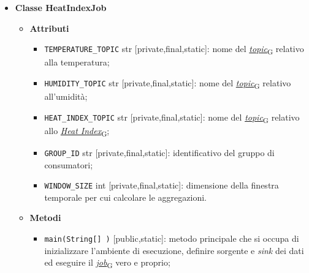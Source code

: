 \begin{itemize}
	\item \textbf{Classe HeatIndexJob}
	      \begin{itemize}
		      \item \textbf{Attributi}
		            \begin{itemize}
			            \item \texttt{TEMPERATURE\_TOPIC} str [private,final,static]: nome del \href{https://7last.github.io/docs/pb/documentazione-interna/glossario\#topic}{\textit{topic}\textsubscript{G}} relativo alla temperatura;
			            \item \texttt{HUMIDITY\_TOPIC} str [private,final,static]: nome del \href{https://7last.github.io/docs/pb/documentazione-interna/glossario\#topic}{\textit{topic}\textsubscript{G}} relativo all'umidità;
			            \item \texttt{HEAT\_INDEX\_TOPIC} str [private,final,static]: nome del \href{https://7last.github.io/docs/pb/documentazione-interna/glossario\#topic}{\textit{topic}\textsubscript{G}} relativo allo \href{https://7last.github.io/docs/pb/documentazione-interna/glossario\#heat-index}{\textit{Heat Index}\textsubscript{G}};
			            \item \texttt{GROUP\_ID} str [private,final,static]: identificativo del gruppo di consumatori;
			            \item \texttt{WINDOW\_SIZE} int [private,final,static]: dimensione della finestra temporale per cui calcolare le aggregazioni.
		            \end{itemize}
		      \item \textbf{Metodi}
		            \begin{itemize}
			            \item \texttt{main(String[] )} [public,static]: metodo principale che si occupa di inizializzare l'ambiente di esecuzione, definire sorgente e \textit{sink} dei dati ed eseguire il \href{https://7last.github.io/docs/pb/documentazione-interna/glossario\#job}{\textit{job}\textsubscript{G}} vero e proprio;


\end{itemize}
\end{itemize}
\end{itemize}
